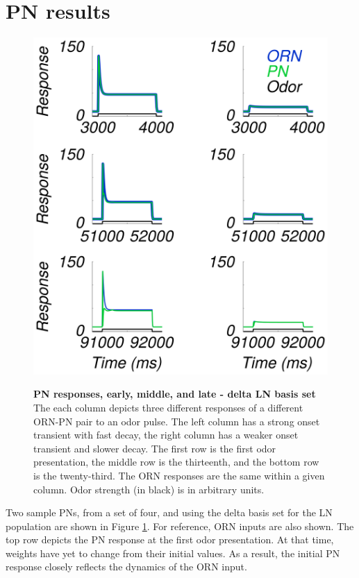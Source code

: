 \documentclass[a4paper,12pt,twoside]{article}
\begin{document}
\section{PN results}

\begin{figure}
\centering
\caption{\textbf{PN responses, early, middle, and late - delta LN basis set}  The each column depicts three different responses of a different ORN-PN pair to an odor pulse.  The left column has a strong onset transient with fast decay, the right column has a weaker onset transient and slower decay.  The first row is the first odor presentation, the middle row is the thirteenth, and the bottom row is the twenty-third.  The ORN responses are the same within a given column.  Odor strength (in black) is in arbitrary units.}
\hspace*{-1.5 cm}
\includegraphics[scale=0.72]{2016-09-02_PN_3timepoints_deltabasis.png}
\label{fig:pn1}
\end{figure}

Two sample PNs, from a set of four, and using the delta basis set for the LN population are shown in Figure \ref{fig:pn1}.  For reference, ORN inputs are also shown.  The top row depicts the PN response at the first odor presentation.  At that time, weights have yet to change from their initial values.  As a result, the initial PN response closely reflects the dynamics of the ORN input.
\end{document}
